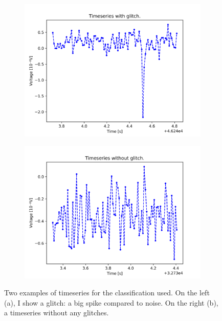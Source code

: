 \documentclass[12pt,a4paper,final]{book}			%
\begin{document}
				\begin{figure}[h]
   					\centering
				  \begin{subfigure}{0.6\textwidth}
				        \centering
				        \includegraphics[scale=0.5]{figures/glitch.png}
				        \caption{}
			    \end{subfigure}%
			    \begin{subfigure}{0.6\textwidth}
					\centering
			        \includegraphics[scale=0.5]{figures/no_glitch.png}
					\caption{}
			    \end{subfigure}
			    \caption{Two examples of timeseries for the classification used. On the left (a), I show a glitch: a big spike compared to noise. On the right (b), a timeseries without any glitches.}
			    \label{timeseries_plot}
			\end{figure}			
				
\end{document}
